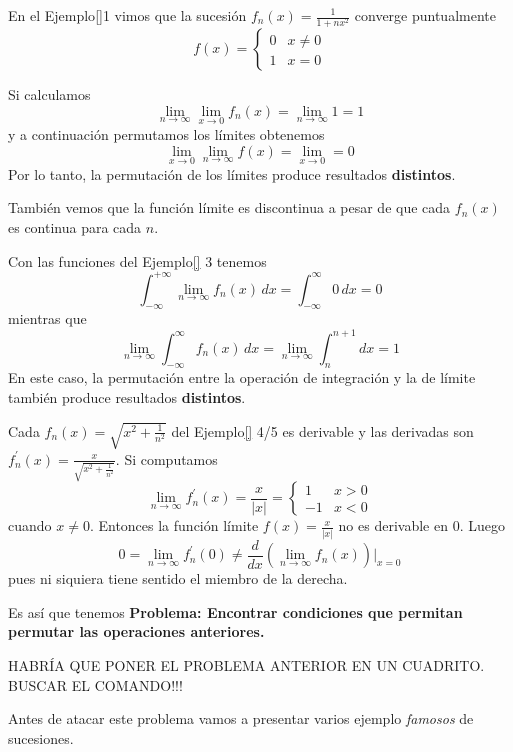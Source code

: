 \begin{ejemplo}
En el Ejemplo\ref{}1 vimos que  la sucesión 
$f_n(x)=\frac{1}{1+nx^2}$ converge puntualmente 
\[f(x)=\left\{\begin{array}{ll}
0&x\neq 0
\\
1&x=0
\end{array}
\right.\]

Si calculamos 
\[
\lim\limits_{n\to \infty}\lim\limits_{x \to 0}f_n(x)=\lim\limits_{n \to \infty}1=1
\]
y a continuación permutamos los límites obtenemos
\[
\lim\limits_{x\to 0}\lim\limits_{n \to \infty}f (x)=\lim\limits_{x \to 0}=0
\]
Por lo tanto, la permutación de los límites produce resultados \textbf{distintos}.

También vemos que la función límite es discontinua a pesar de que cada $f_n(x)$ es continua para cada $n$.
\end{ejemplo}

\begin{ejemplo}
Con las funciones del Ejemplo\ref{} 3 tenemos
\[
\int_{-\infty}^{+\infty} \lim\limits_{n \to  \infty} f_n(x)\,dx=\int_{-\infty}^{\infty} 0\,dx=0
\]
mientras que 
\[
\lim\limits_{n \to \infty} \int_{-\infty}^{\infty} f_n(x)\,dx=\lim\limits_{n \to \infty} \int_{n}^{n+1}dx=1
\]
En este caso, la permutación entre la operación de integración y la de límite también produce resultados \textbf{distintos}.
\end{ejemplo}

\begin{ejemplo}
Cada $f_n(x)=\sqrt{x^2+\frac{1}{n^2}}$ del Ejemplo\ref{} 4/5 es derivable y las derivadas son
$f_n^{'}(x)=\frac{x}{\sqrt{x^2+\frac{1}{n^2}}}$. 
Si computamos
\[
\lim\limits_{n \to \infty} f_n^{'}(x)=\frac{x}{|x|}=
\left\{
\begin{array}{ll}
1&x>0
\\
-1&x<0
\end{array}
\right.\]
cuando $x\neq 0$.
Entonces la funci\'on límite $f(x)=\frac{x}{|x|}$ no es derivable en 0. Luego  
\[
0=\lim\limits_{n \to \infty}f_n^{'}(0)\neq \frac{d}{dx}(\lim\limits_{n \to \infty}f_n(x))|_{x=0}
\]
pues ni siquiera tiene sentido el miembro de la derecha.
\end{ejemplo}

Es así que tenemos  
\textbf{
Problema: 
Encontrar condiciones que permitan permutar las operaciones anteriores.}

HABRÍA QUE PONER EL PROBLEMA ANTERIOR EN UN CUADRITO. BUSCAR EL COMANDO!!!

Antes de atacar este problema vamos a presentar varios ejemplo \textit{famosos} de sucesiones.


